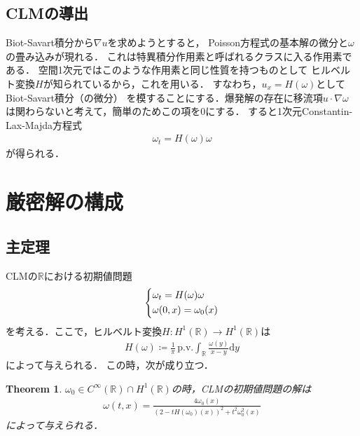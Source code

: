 \documentclass[dvipdfmx,autodetect-engine]{jsarticle}
\newtheorem{theorem}{Theorem}[section]
\theoremstyle{remark}
\theoremstyle{definition}
\newcommand{\R}{\mathbb{R}}
\begin{document}
\subsection{CLMの導出}
Biot-Savart積分から$\nabla u$を求めようとすると，
Poisson方程式の基本解の微分と$\omega$の畳み込みが現れる．
これは特異積分作用素と呼ばれるクラスに入る作用素である．
空間1次元ではこのような作用素と同じ性質を持つものとして
ヒルベルト変換$H$が知られているから，これを用いる．
すなわち，$u_x = H(\omega)$としてBiot-Savart積分（の微分）
を模することにする．爆発解の存在に移流項$u\cdot \nabla \omega$
は関わらないと考えて，簡単のためこの項を0にする．
すると1次元Constantin-Lax-Majda方程式
\begin{align}
    \omega_t = H(\omega)\omega 
\end{align}
が得られる．
\section{厳密解の構成}
\subsection{主定理}
CLMの$\R$における初期値問題
\begin{align}
    \begin{dcases}
        \omega_t = H(\omega)\omega \\
        \omega(0,x) = \omega_0(x)
    \end{dcases}
\end{align}
を考える．ここで，ヒルベルト変換$H:H^1(\R)\to H^1(\R)$は
\begin{align}
    H(\omega) \coloneqq \frac{1}{\pi} \, \mathrm{p.v.} \int_{\R} \frac{\omega(y)}{x-y} \mathrm{d}y
\end{align}
によって与えられる．
この時，次が成り立つ．
\begin{theorem}\label{main_theorem}
    $\omega_0 \in C^{\infty}(\R) \cap H^{1}(\R)$の時，CLMの初期値問題の解は
    \begin{align}
        \omega (t,x) = \frac{4\omega_0 (x)}{(2-tH(\omega_0)(x))^2 + t^2 \omega_0^2(x)}
    \end{align}
    によって与えられる．
\end{theorem}
\end{document}

